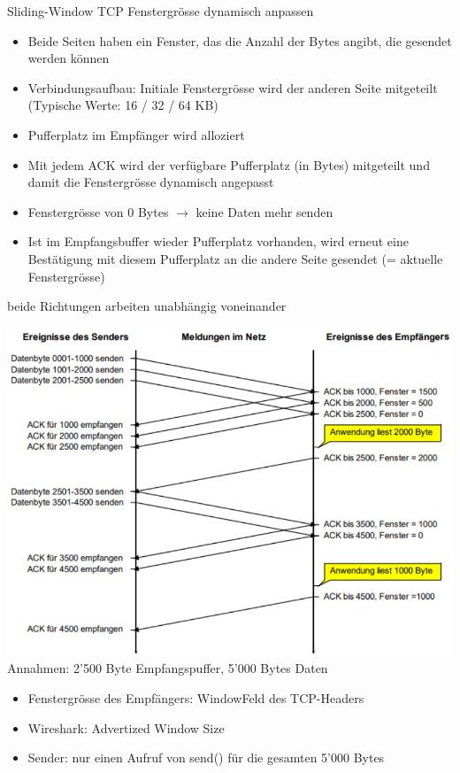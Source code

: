 \begin{KR}{Sliding-Window TCP} Fenstergrösse dynamisch anpassen
    \begin{itemize}
        \item Beide Seiten haben ein Fenster, das die Anzahl der Bytes angibt, die gesendet werden können
        \item Verbindungsaufbau: Initiale Fenstergrösse wird der anderen Seite mitgeteilt (Typische Werte: 16 / 32 / 64 KB)
        \item Pufferplatz im Empfänger wird alloziert
        \item Mit jedem ACK wird der verfügbare Pufferplatz (in Bytes) mitgeteilt und damit die Fenstergrösse dynamisch angepasst
        \item Fenstergrösse von 0 Bytes $\rightarrow$ keine Daten mehr senden
        \item Ist im Empfangsbuffer wieder Pufferplatz vorhanden, wird erneut eine Bestätigung mit diesem Pufferplatz an die andere Seite gesendet (= aktuelle Fenstergrösse)
    \end{itemize}
    {\small beide Richtungen arbeiten unabhängig voneinander}
\end{KR}



\begin{example}
        \includegraphics[width=1\linewidth]{images/flusssteuerung_tcp.png}\\
    Annahmen: 2'500 Byte Empfangspuffer, 5'000 Bytes Daten
    \begin{itemize}
        \item Fenstergrösse des Empfängers: WindowFeld des TCP-Headers
        \item Wireshark: Advertized Window Size
        \item Sender: nur einen Aufruf von send() für die gesamten 5'000 Bytes
    \end{itemize}
\end{example}



